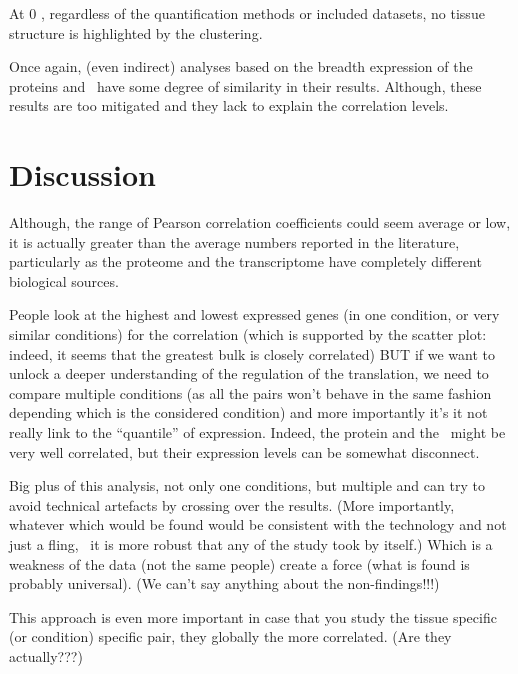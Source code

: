 At $0$ \FPKM, regardless of the quantification methods or included datasets,
no tissue structure is highlighted by the clustering.

Once again,
(even indirect) analyses based on the
breadth expression of the proteins and \mRNAs\
have some degree of similarity in their results.
Although, these results are too mitigated and
they lack to explain the correlation levels.\\
\vspace{-\baselineskip}



\section{Discussion}

Although, the range of Pearson correlation coefficients could seem average or
low, it is actually greater than the average numbers reported in the literature,
\TK{Add citation list}
particularly as the proteome and the transcriptome have completely different
biological sources.


People look at the highest and lowest expressed genes (in one condition, or very
similar conditions) for the correlation (which is supported by the scatter plot:
indeed, it seems that the greatest bulk is closely correlated) {\Large BUT} if we
want to unlock a deeper understanding of the regulation of the translation, we need
to compare multiple conditions (as all the pairs won't behave in the same fashion
depending which is the considered condition) and more importantly it's it not
really link to the ``quantile'' of expression. Indeed, the protein and the \mRNA\
might be very well correlated, but their expression levels can be somewhat disconnect.

Big plus of this analysis, not only one conditions, but multiple and can try to
avoid technical artefacts by crossing over the results. (More importantly, whatever
which would be found would be consistent with the technology and not just a fling,
\ie\ it is more robust that any of the study took by itself.)
Which is a weakness of the data (not the same people) create a force (what is found
is probably universal). (We can't say anything about the non-findings!!!)

This approach is even more important in case that you study the tissue specific
(or condition) specific pair, they globally the more correlated. (Are they actually???)

